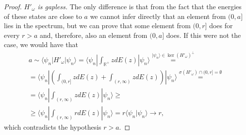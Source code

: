 \documentclass[cmp]{svjour}
\newcommand{\w}{\omega}
\newcommand{\R}{\mathbb{R}}
\newcommand{\bra}[1]{\langle #1|}
\newcommand{\ket}[1]{|#1\rangle}
\newcommand{\braket}[2]{\langle #1|#2\rangle}
\begin{document}
\begin{proof} {\it $H'_\w$ is gapless.}
    The only difference is that from the fact that the energies of these states are close to $a$ we cannot infer directly that an element from $(0,a]$ lies in the spectrum, but we can prove that some element from $(0,r]$ does for every $r > a$ and, therefore, also an element from $(0,a]$ does. If this were not the case, we would have that
    \begin{gather*}
        a\sim \bra{\psi_n}H'_\w\ket{\psi_n}=\bra{\psi_n}\int_{\R^+} zdE(z)\ket{\psi_n}\stackrel{\ket{\psi_n}\in \ker(H'_\w)^\bot}{=}
        \\
        =\bra{\psi_n}\left(\int_{(0,r]} zdE(z) +\int_{(r,\infty)} zdE(z)\right)\ket{\psi_n}
        \stackrel{\sigma(H'_\omega)\cap (0,r]=\emptyset}{=}
        \\
        = \bra{\psi_n}\int_{(r,\infty)} zdE(z)\ket{\psi_n}\ge
        \\
        \ge \bra{\psi_n}\int_{(r,\infty)} rdE(z)\ket{\psi_n}=r \braket{\psi_n}{\psi_n}\to r,
    \end{gather*}
    \noindent which contradicts the hypothesis $r>a$.
\end{proof}
\bigskip
\bigskip
\end{document}
